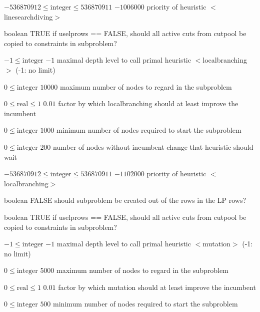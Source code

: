 %
{$-536870912\leq\textrm{integer}\leq536870911$}%
{$-1006000$}%
{priority of heuristic $<$linesearchdiving$>$}%
{}

%
{boolean}%
{TRUE}%
{if uselprows == FALSE, should all active cuts from cutpool be copied to constraints in subproblem?}%
{}

%
{$-1\leq\textrm{integer}$}%
{$-1$}%
{maximal depth level to call primal heuristic $<$localbranching$>$ (-1: no limit)}%
{}

%
{$0\leq\textrm{integer}$}%
{$10000$}%
{maximum number of nodes to regard in the subproblem}%
{}

%
{$0\leq\textrm{real}\leq1$}%
{$0.01$}%
{factor by which localbranching should at least improve the incumbent  }%
{}

%
{$0\leq\textrm{integer}$}%
{$1000$}%
{minimum number of nodes required to start the subproblem}%
{}

%
{$0\leq\textrm{integer}$}%
{$200$}%
{number of nodes without incumbent change that heuristic should wait}%
{}

%
{$-536870912\leq\textrm{integer}\leq536870911$}%
{$-1102000$}%
{priority of heuristic $<$localbranching$>$}%
{}

%
{boolean}%
{FALSE}%
{should subproblem be created out of the rows in the LP rows?}%
{}

%
{boolean}%
{TRUE}%
{if uselprows == FALSE, should all active cuts from cutpool be copied to constraints in subproblem?}%
{}

%
{$-1\leq\textrm{integer}$}%
{$-1$}%
{maximal depth level to call primal heuristic $<$mutation$>$ (-1: no limit)}%
{}

%
{$0\leq\textrm{integer}$}%
{$5000$}%
{maximum number of nodes to regard in the subproblem}%
{}

%
{$0\leq\textrm{real}\leq1$}%
{$0.01$}%
{factor by which mutation should at least improve the incumbent}%
{}

%
{$0\leq\textrm{integer}$}%
{$500$}%
{minimum number of nodes required to start the subproblem}%
{}

